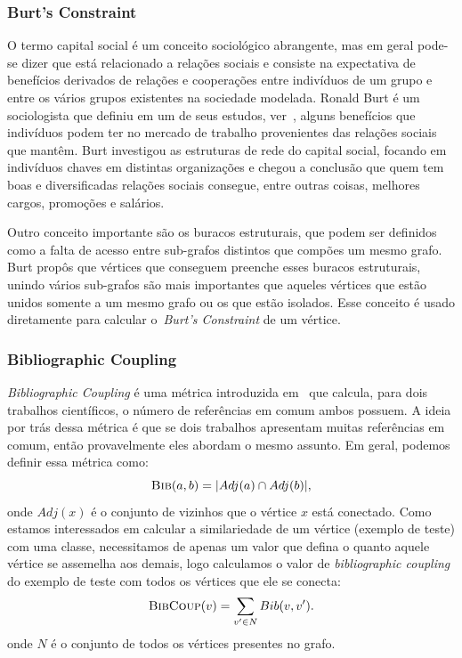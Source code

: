 \subsubsection{Burt's Constraint}
\label{subsubsection::constraint}

O termo capital social é um conceito sociológico abrangente, mas em geral pode-se dizer que está relacionado a relações sociais e consiste na expectativa de benefícios derivados de relações e cooperações entre indivíduos de um grupo e entre os vários grupos existentes na sociedade modelada. Ronald Burt é um sociologista que definiu em um de seus estudos, ver~\cite{Burt92}, alguns benefícios que indivíduos podem ter no mercado de trabalho provenientes das relações sociais que mantêm. Burt investigou as estruturas de rede do capital social, focando em indivíduos chaves em distintas organizações e chegou a conclusão que quem tem boas e diversificadas relações sociais consegue, entre outras coisas, melhores cargos, promoções e salários.  

Outro conceito importante são os buracos estruturais, que podem ser definidos como a falta de acesso entre sub-grafos distintos que compões um mesmo grafo. Burt propôs que vértices que conseguem preenche esses buracos estruturais, unindo vários sub-grafos são mais importantes que aqueles vértices que estão unidos somente a um mesmo grafo ou os que estão isolados. Esse conceito é usado diretamente para calcular o~\textit{Burt's Constraint} de um vértice.

\subsubsection{Bibliographic Coupling}
\label{subsubsection::bibcoup}
\textit{Bibliographic Coupling} é uma métrica introduzida em~\cite{Kessler63} que calcula, para dois trabalhos científicos, o número de referências em comum ambos possuem. A ideia por trás dessa métrica é que se dois trabalhos apresentam muitas referências em comum, então provavelmente eles abordam o mesmo assunto. Em geral, podemos definir essa métrica como:
\begin{equation}
\textsc{Bib}(a, b) =  |Adj(a) \cap Adj(b)|,
\end{equation}
onde $Adj(x)$ é o conjunto de vizinhos que o vértice $x$ está conectado. Como estamos interessados em calcular a similariedade de um vértice (exemplo de teste) com uma classe, necessitamos de apenas um valor que defina o quanto aquele vértice se assemelha aos demais, logo calculamos o valor de \textit{bibliographic coupling} do exemplo de teste com todos os vértices que ele se conecta:
\begin{equation}
\textsc{BibCoup}(v) =  \sum\limits_{v' \in N} Bib(v,v').
\end{equation}
onde $N$ é o conjunto de todos os vértices presentes no grafo.


